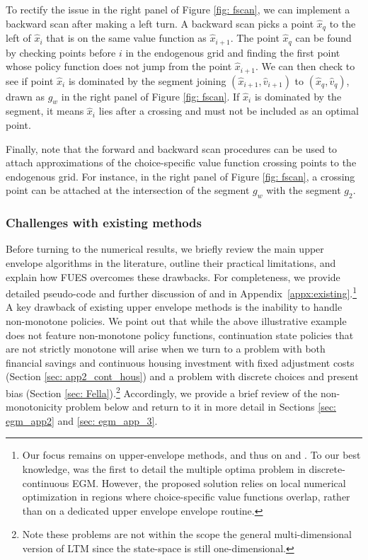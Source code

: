 \documentclass[12pt]{article}
\begin{document}
To rectify the issue in the right panel of Figure \ref{fig: fscan}, we can implement a backward scan after making a left turn. A backward scan picks a point $\hat{x}_{q}$ to the left of $\hat{x}_{i}$ that is on the same value function as $\hat{x}_{i+1}$. The point $\hat{x}_{q}$ can be found by checking points before $i$ in the endogenous grid and finding the first point whose policy function does not jump from the point $\hat{x}_{i+1}$.  We can then check to see if point $\hat{x}_{i}$ is dominated by the segment joining $(\hat{x}_{i+1},\hat{v}_{i+1})$ to $(\hat{x}_{q}, \hat{v}_{q})$, drawn as $g_{w}$ in the right panel of Figure \ref{fig: fscan}. If $\hat{x}_{i}$ is dominated by the segment, it means $\hat{x}_{i}$ lies after a crossing and must not be included as an optimal point.

Finally, note that the forward and backward scan procedures can be used to attach approximations of the choice-specific value function crossing points to the endogenous grid. For instance, in the right panel of Figure \ref{fig: fscan}, a crossing point can be attached at the intersection of the segment $g_{w}$ with the segment $g_{2}$.



\subsubsection{Challenges with existing methods}\label{subsubsec:challenges}

Before turning to the numerical results, we briefly review the main 
upper envelope algorithms in the literature, outline their practical limitations, and
explain how FUES overcomes these drawbacks. For completeness, we provide detailed pseudo-code and further discussion of \citet{Iskhakov2017} and
\citet{Druedahl2017} in Appendix~\ref{appx:existing}.\footnote{Our focus remains on upper-envelope methods, and thus on \citet{Iskhakov2017} and
\citet{Druedahl2017}. To our best knowledge, \citet{Fella2014} was the first to detail the
multiple optima problem in discrete-continuous EGM. However, the proposed solution relies on local
numerical optimization in regions where choice-specific value functions
overlap, rather than on a dedicated upper envelope envelope routine.} A key drawback of existing upper envelope methods is the inability to handle non-monotone policies. We point out that while the above illustrative example does not feature non-monotone policy functions, continuation state policies that are not strictly monotone will arise when we turn to a problem with both financial savings and continuous housing investment with fixed adjustment costs (Section \ref{sec: app2_cont_hous}) and a problem with discrete choices and present bias (Section  \ref{sec: Fella}).\footnote{Note these problems are not within the scope the general multi-dimensional version of LTM since the state-space is still one-dimensional.} Accordingly, we provide a brief review of the non-monotonicity problem below and return to it in more detail in Sections \ref{sec: egm_app2} and \ref{sec: egm_app_3}.
\end{document}
